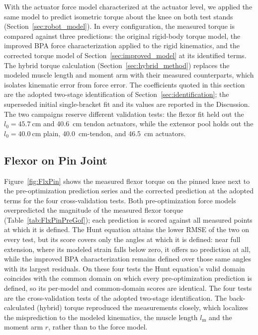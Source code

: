 \documentclass[utf8]{FrontiersinHarvard} %
\begin{document}
With the actuator force model characterized at the actuator level, we applied the same model to predict isometric torque about the knee on both test stands (Section~\ref{sec:robot_model}). In every configuration, the measured torque is compared against three predictions: the original rigid-body torque model, the improved BPA force characterization applied to the rigid kinematics, and the corrected torque model of Section~\ref{sec:improved_model} at its identified terms. The hybrid torque calculation (Section~\ref{sec:hybrid_method}) replaces the modeled muscle length and moment arm with their measured counterparts, which isolates kinematic error from force error. The coefficients quoted in this section are the adopted two-stage identification of Section~\ref{sec:identification}; the superseded initial single-bracket fit and its values are reported in the Discussion. The two campaigns reserve different validation tests: the flexor fit held out the $l_{0}=\qty{45.7}{\cm}$ and \qty{40.6}{\cm} tendon actuators, while the extensor pool holds out the $l_{0}=\qty{40.0}{\cm}$ plain, \qty{40.0}{\cm}-tendon, and \qty{46.5}{\cm} actuators.

\subsection{Flexor on Pin Joint}

Figure~\ref{fig:FlxPin} shows the measured flexor torque on the pinned knee next to the pre-optimization prediction series and the corrected prediction at the adopted terms for the four cross-validation tests. Both pre-optimization force models overpredicted the magnitude of the measured flexor torque (Table~\ref{tab:FlxPinPreGof}); each prediction is scored against all measured points at which it is defined. The Hunt equation attains the lower RMSE of the two on every test, but its score covers only the angles at which it is defined: near full extension, where its modeled strain falls below zero, it offers no prediction at all, while the improved BPA characterization remains defined over those same angles with its largest residuals. On these four tests the Hunt equation's valid domain coincides with the common domain on which every pre-optimization prediction is defined, so its per-model and common-domain scores are identical. The four tests are the cross-validation tests of the adopted two-stage identification. The back-calculated (hybrid) torque reproduced the measurements closely, which localizes the misprediction to the modeled kinematics, the muscle length $l_\text{m}$ and the moment arm $r$, rather than to the force model.
\end{document}
